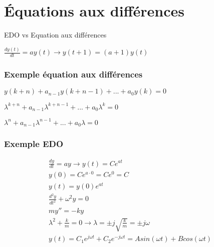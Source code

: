\documentclass[resume]{subfiles}
\begin{document}
\section{Équations aux différences}

EDO vs Equation aux différences

$\frac{dy(t)}{dt} = ay(t) \rightarrow y(t+1)=(a+1)y(t)$ 

\subsubsection{Exemple équation aux différences}

$y(k + n) + a_{n-1}y(k + n-1) +...+ a_0y(k) = 0$

$\lambda^{k+n} + a_{n-1}\lambda^{k+n-1} + . . . + a_0\lambda^k = 0$ 

$\lambda^{n} + a_{n-1}\lambda^{n-1} + . . . + a_0\lambda = 0$ 

\subsubsection{Exemple EDO}
\begin{multline*}
\frac{dy}{dt} = ay \rightarrow y(t) = Ce^{at}\\
y(0) = Ce^{a\cdot 0} = Ce^0 = C\\
y(t) = y(0)e^{at}\\
\frac{d^2y}{dt^2} + \omega^2y = 0\\
my'' = -ky\\
\lambda^2 + \frac{k}{m}=0 \rightarrow \lambda = \pm j\sqrt{\frac{k}{m}}=\pm j\omega\\
y(t)=C_1 e^{j\omega t}+C_2 e^{-j\omega t} = Asin(\omega t)+Bcos(\omega t)
\end{multline*}
\end{document}
